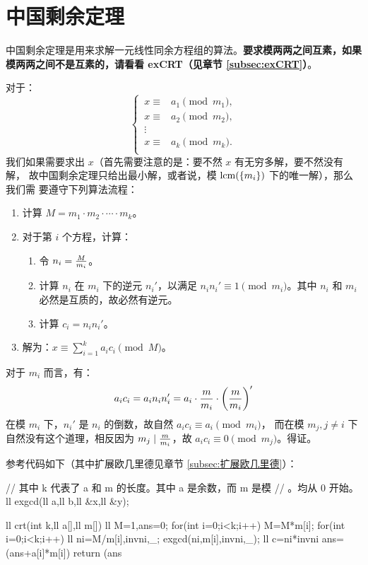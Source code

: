 \section{中国剩余定理}
\label{sec:中国剩余定理}



中国剩余定理是用来求解一元线性同余方程组的算法。\textbf{要求模两两之间互素，如果
模两两之间不是互素的，请看看 exCRT（见章节 \ref{subsec:exCRT}）}。

对于：\[
    \left\{\,
        \begin{aligned}
            x \equiv{}&{} a_1 \pmod {m_1}, \\
            x \equiv{}&{} a_2 \pmod {m_2}, \\
              \vdots{}&{} \\
            x \equiv{}&{} a_k \pmod {m_k}. \\
        \end{aligned}
    \right.
\]我们如果需要求出 $x$（首先需要注意的是：要不然 $x$ 有无穷多解，要不然没有解，
故中国剩余定理只给出最小解，或者说，模 $\mathrm{lcm}(\{m_i\})$ 下的唯一解），那么我们需
要遵守下列算法流程：
\begin{enumerate}
    \item 计算 $M = m_1 \cdot m_2 \cdot \cdots \cdot m_k$。
    \item 对于第 $i$ 个方程，计算：
        \begin{enumerate}
            \item 令 $n_i = {M \over m_i}$。
            \item 计算 $n_i$ 在 $m_i$ 下的逆元 $n_i'$，以满足 $n_i n_i' \equiv 1 \pmod
                {m_i}$。其中 $n_i$ 和 $m_i$ 必然是互质的，故必然有逆元。
            \item 计算 $c_i = n_i n_i'$。
        \end{enumerate}
    \item 解为：$x \equiv \sum_{i=1}^k a_i c_i \pmod M$。
\end{enumerate}

对于 $m_i$ 而言，有：\[
    a_i c_i = a_i n_i n_i' = a_i \cdot {m \over m_i} \cdot \left({m \over m_i}\right)'
\]在模 $m_i$ 下，$n_i'$ 是 $n_i$ 的倒数，故自然 $a_i c_i \equiv a_i \pmod {m_i}$，
而在模 $m_j, j \ne i$ 下自然没有这个道理，相反因为 $m_j \mid {m \over m_i}$，故
$a_i c_i \equiv 0 \pmod {m_j}$。得证。

参考代码如下（其中扩展欧几里德见章节 \ref{subsec:扩展欧几里德}）：
\begin{Cpp}
// 其中 k 代表了 a 和 m 的长度。其中 a 是余数，而 m 是模
// 。均从 0 开始。
ll exgcd(ll a,ll b,ll &x,ll &y);

ll crt(int k,ll a[],ll m[]){
  ll M=1,ans=0;
  for(int i=0;i<k;i++) M=M*m[i];
  for(int i=0;i<k;i++) {
    ll ni=M/m[i],invni,_;
    exgcd(ni,m[i],invni,_);
    ll c=ni*invni%
    ans=(ans+a[i]*m[i])%
  }
  return (ans%
}
\end{Cpp}



